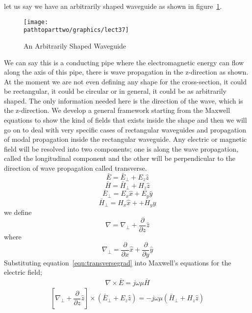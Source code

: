 let us say we have an arbitrarily shaped waveguide as shown in figure~\ref{fig:lect37}.
\begin{figure}[h]
\centering
\texttt{[image: \\pathtoparttwo/graphics/lect37]}
\caption{An Arbitrarily Shaped Waveguide}
\label{fig:lect37}
\end{figure}
We can say this is a conducting pipe where the electromagnetic energy can flow along the axis of this pipe, there is wave propagation in the z-direction as shown. At the moment we are not even defining any shape for the cross-section, it could be rectangular, it could be circular or in general, it could be as arbitrarily shaped. The only information needed here is the direction of the wave, which is the z-direction. We develop a general framework starting from the Maxwell equations to show the kind of fields that exists inside the shape and then we will go on to deal with very specific cases of rectangular waveguides and propagation of modal propagation inside the rectangular waveguide. Any electric or magnetic field will be resolved into two components; one is along the wave propagation, called the longitudinal component and the other will be perpendicular to the direction of wave propagation called transverse.
\begin{equation*}
\bar{E} = \bar{E}_\bot + E_z\hat{z}
\end{equation*}
\begin{equation*}
\bar{H} = \bar{H}_\bot + H_z\hat{z}
\end{equation*}
\begin{equation*}
\bar{E}_\bot = E_x\hat{x} + E_y\hat{y}
\end{equation*}
\begin{equation*}
\bar{H}_\bot = H_x\hat{x} + + H_y\hat{y}
\end{equation*}
we define
\begin{equation}
\nabla = \nabla_\bot + \frac{\partial}{\partial z}\hat{z}
\label{eqn:transversegrad}
\end{equation}
where
\begin{equation*}
\nabla_\bot = \frac{\partial}{\partial x}\hat{x} + \frac{\partial}{\partial y}\hat{y}
\end{equation*}
Substituting equation~\ref{eqn:transversegrad} into Maxwell's equations for the electric field;
\begin{align*}
\nabla\times\bar{E} = j\omega\mu\bar{H}
\end{align*}
\begin{dmath*}
\left[\nabla_\bot + \frac{\partial}{\partial z}\hat{z}\right]\times(\bar{E}_\bot + E_z\hat{z}) = -j\omega\mu(\bar{H}_\bot + H_z\hat{z})
\end{dmath*}
